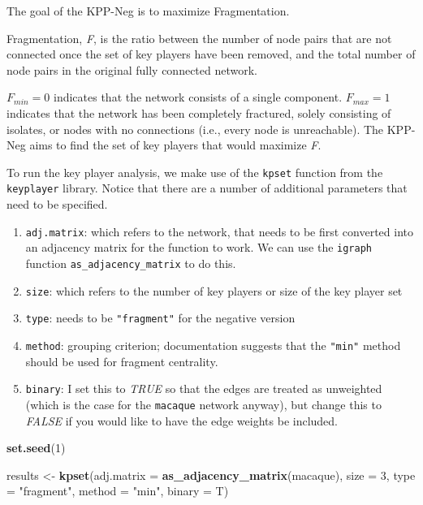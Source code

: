 \documentclass[
]{book}
\newenvironment{Shaded}{\begin{snugshade}}{\end{snugshade}}
\newcommand{\AttributeTok}[1]{\textcolor[rgb]{0.13,0.29,0.53}{#1}}
\newcommand{\DecValTok}[1]{\textcolor[rgb]{0.00,0.00,0.81}{#1}}
\newcommand{\FunctionTok}[1]{\textcolor[rgb]{0.13,0.29,0.53}{\textbf{#1}}}
\newcommand{\NormalTok}[1]{#1}
\newcommand{\OtherTok}[1]{\textcolor[rgb]{0.56,0.35,0.01}{#1}}
\newcommand{\StringTok}[1]{\textcolor[rgb]{0.31,0.60,0.02}{#1}}
\providecommand{\tightlist}{%
  \setlength{\itemsep}{0pt}\setlength{\parskip}{0pt}}
\begin{document}
The goal of the KPP-Neg is to maximize Fragmentation.

Fragmentation, \emph{F}, is the ratio between the number of node pairs that are not connected once the set of key players have been removed, and the total number of node pairs in the original fully connected network.

\(F_{min} = 0\) indicates that the network consists of a single component. \(F_{max} = 1\) indicates that the network has been completely fractured, solely consisting of isolates, or nodes with no connections (i.e., every node is unreachable). The KPP-Neg aims to find the set of key players that would maximize \emph{F}.

To run the key player analysis, we make use of the \texttt{kpset} function from the \texttt{keyplayer} library. Notice that there are a number of additional parameters that need to be specified.

\begin{enumerate}
\def\labelenumi{(\roman{enumi})}
\tightlist
\item
  \texttt{adj.matrix}: which refers to the network, that needs to be first converted into an adjacency matrix for the function to work. We can use the \texttt{igraph} function \texttt{as\_adjacency\_matrix} to do this.
\item
  \texttt{size}: which refers to the number of key players or size of the key player set
\item
  \texttt{type}: needs to be \texttt{"fragment"} for the negative version
\item
  \texttt{method}: grouping criterion; documentation suggests that the \texttt{"min"} method should be used for fragment centrality.
\item
  \texttt{binary}: I set this to \emph{TRUE} so that the edges are treated as unweighted (which is the case for the \texttt{macaque} network anyway), but change this to \emph{FALSE} if you would like to have the edge weights be included.
\end{enumerate}

\begin{Shaded}
\begin{Highlighting}[]
\FunctionTok{set.seed}\NormalTok{(}\DecValTok{1}\NormalTok{)}

\NormalTok{results }\OtherTok{\textless{}{-}} \FunctionTok{kpset}\NormalTok{(}\AttributeTok{adj.matrix =} \FunctionTok{as\_adjacency\_matrix}\NormalTok{(macaque), }
                 \AttributeTok{size =} \DecValTok{3}\NormalTok{, }
                 \AttributeTok{type =} \StringTok{"fragment"}\NormalTok{, }
                 \AttributeTok{method =} \StringTok{"min"}\NormalTok{, }
                 \AttributeTok{binary =}\NormalTok{ T)}
\end{Highlighting}
\end{Shaded}
\end{document}
